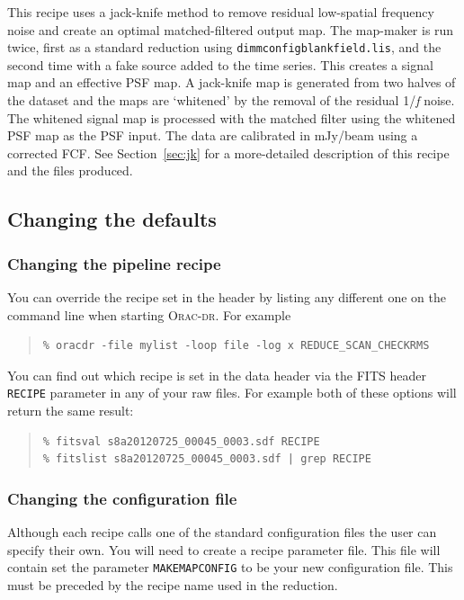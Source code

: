 \documentclass[twoside,11pt]{article}
\newcommand{\htmladdnormallink}[2]{#1}
\newcommand{\htmlref}[2]{#1}
\newcommand{\latexhtml}[2]{#1}
\renewcommand{\_}{\texttt{\symbol{95}}}
\newenvironment{myquote}{\begin{quote}\begin{small}}{\end{small}\end{quote}}
\newcommand{\oracdr}{\htmladdnormallink{\textsc{Orac-dr}}{http://www.oracdr.org/oracdr}}
\newcommand{\param}[1]{\texttt{#1}}
\newcommand{\cref}[3]{\latexhtml{#1~\ref{#2}}{\htmlref{#3}{#2}}}
\begin{document}
This recipe uses a jack-knife method to remove residual low-spatial
frequency noise and create an optimal matched-filtered output map. The
map-maker is run twice, first as a standard reduction using
\texttt{dimmconfig\_blank\_field.lis}, and the second time with a fake
source added to the time series. This creates a signal map and an
effective PSF map. A jack-knife map is generated from two halves of
the dataset and the maps are `whitened' by the removal of the residual
1/\emph{f} noise. The whitened signal map is processed with the
matched filter using the whitened PSF map as the PSF input. The data
are calibrated in mJy/beam using a corrected FCF. See
\cref{Section}{sec:jk}{Example 2 - Advanced pipeline method} for a
more-detailed description of this recipe and the files produced.

\subsection{Changing the defaults}
\label{sec:parameterfile}
\subsubsection{Changing the pipeline recipe}
You can override the recipe set in the header by listing any different
one on the command line when starting \oracdr. For example
\begin{myquote}
\begin{verbatim}
% oracdr -file mylist -loop file -log x REDUCE_SCAN_CHECKRMS
\end{verbatim}
\end{myquote}

You can find out which recipe is set in the data header via the FITS
header \texttt{RECIPE} parameter in any of your raw files.  For
example both of these options will return the same result:
\begin{myquote}
\begin{verbatim}
% fitsval s8a20120725_00045_0003.sdf RECIPE
% fitslist s8a20120725_00045_0003.sdf | grep RECIPE
\end{verbatim}
\end{myquote}

\subsubsection{Changing the configuration file}

Although each recipe calls one of the standard configuration files the
user can specify their own. You will need to create a recipe parameter
file. This file will contain set the parameter \param{MAKEMAP\_CONFIG} to be
your new configuration file. This must be preceded by the recipe name
used in the reduction.
\end{document}
